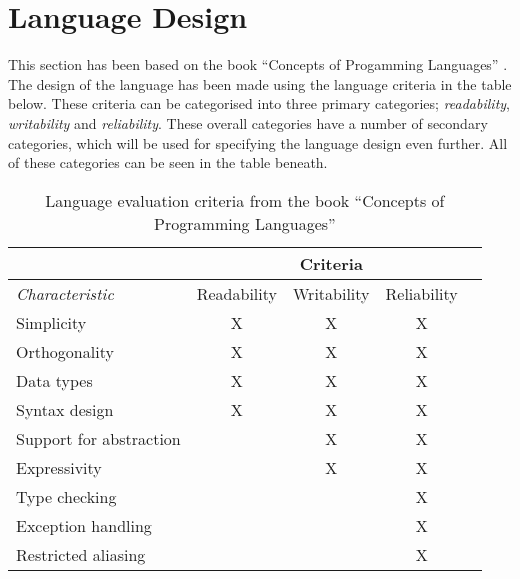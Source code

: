 \chapter{Language Design}

This section has been based on the book ``Concepts of Progamming Languages'' \cite{CoPL}. \\
The design of the language has been made using the language criteria in the table below. These criteria can be categorised into three primary categories; \textit{readability}, \textit{writability} and \textit{reliability}. These overall categories have a number of secondary categories, which will be used for specifying the language design even further. All of these categories can be seen in the table beneath.

\begin{table}[htbp]
\centering
\begin{tabular}{|l|c|c|c|c|}
\hline
& & Criteria & \\ \hline
\textit{Characteristic} & Readability & Writability & Reliability \\ \hline
Simplicity & X & X & X \\ \hline
Orthogonality & X & X & X \\ \hline
Data types & X & X & X \\ \hline
Syntax design & X & X & X  \\ \hline
Support for abstraction & & X & X  \\ \hline
Expressivity & & X & X \\ \hline
Type checking & & & X \\ \hline
Exception handling & & & X \\ \hline
Restricted aliasing & & & X \\ \hline
\end{tabular}
\caption{Language evaluation criteria from the book ``Concepts of Programming Languages''\cite{CoPL}}
\label{tbl:evaluation criteria}
\end{table}

